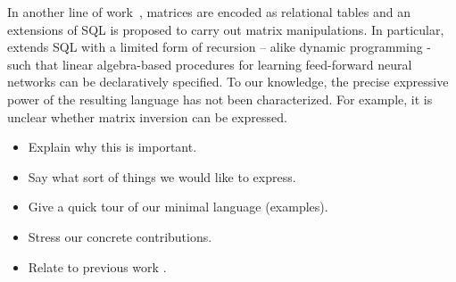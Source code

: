 In another line of work~\cite{}, matrices are encoded as relational tables and an extensions of SQL is proposed to carry out matrix manipulations. In particular, \cite{} extends SQL with a limited form of recursion -- alike dynamic programming - such that linear algebra-based procedures for learning feed-forward neural networks can be declaratively specified. To our knowledge, the precise expressive power of the resulting language has not been characterized. For example, it is unclear whether matrix inversion can be expressed.
%
%
%
%


\begin{itemize}
\item Explain why this is important.
\item Say what sort of things we would like to express.
\item Give a quick tour of our minimal language (examples).
\item Stress our concrete contributions.
\item Relate to previous work \cite{matlang,BrijderGBW19,Geerts19,HutchisonHS17}.
\end{itemize}

